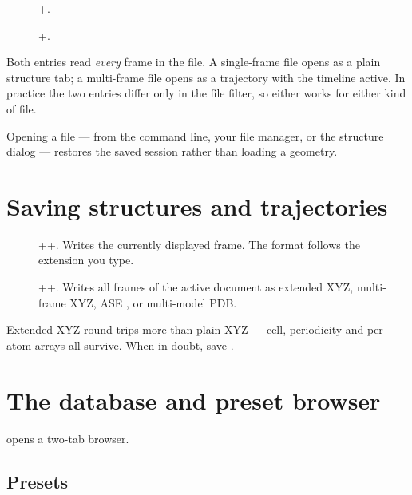 \begin{description}
  \item[\menusep{}\menusep{}]
    +.
  \item[\menusep{}\menusep{}]
    +.
\end{description}

Both entries read \emph{every} frame in the file. A single-frame file opens
as a plain structure tab; a multi-frame file opens as a trajectory with the
timeline active. In practice the two entries differ only in the file
filter, so either works for either kind of file.

Opening a  file --- from the command line, your file
manager, or the structure dialog --- restores the saved session rather than
loading a geometry.

\section{Saving structures and trajectories}

\begin{description}
  \item[\menusep{}\menusep{}]
    ++. Writes the currently displayed frame.
    The format follows the extension you type.
  \item[\menusep{}\menusep{}]
    ++. Writes all frames of the active
    document as extended XYZ, multi-frame XYZ, ASE , or
    multi-model PDB.
\end{description}

\begin{caltip}
Extended XYZ round-trips more than plain XYZ --- cell, periodicity and
per-atom arrays all survive. When in doubt, save .
\end{caltip}

\section{The database and preset browser}
\label{sec:database}

\menusep{} opens a two-tab browser.

\subsection{Presets}

